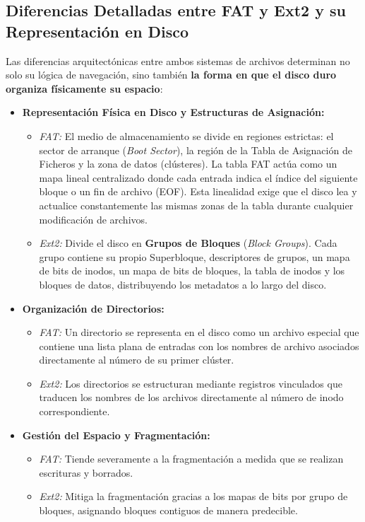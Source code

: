 \documentclass[12pt,a4paper]{article}
\begin{document}
	\subsection{Diferencias Detalladas entre FAT y Ext2 y su Representación en Disco}
	Las diferencias arquitectónicas entre ambos sistemas de archivos determinan no solo su lógica de navegación, sino también \textbf{la forma en que el disco duro organiza físicamente su espacio}:
	\begin{itemize}
		\item \textbf{Representación Física en Disco y Estructuras de Asignación:} 
		\begin{itemize}
			\item \textit{FAT:} El medio de almacenamiento se divide en regiones estrictas: el sector de arranque (\textit{Boot Sector}), la región de la Tabla de Asignación de Ficheros y la zona de datos (clústeres). La tabla FAT actúa como un mapa lineal centralizado donde cada entrada indica el índice del siguiente bloque o un fin de archivo (EOF). Esta linealidad exige que el disco lea y actualice constantemente las mismas zonas de la tabla durante cualquier modificación de archivos.
			\item \textit{Ext2:} Divide el disco en \textbf{Grupos de Bloques} (\textit{Block Groups}). Cada grupo contiene su propio Superbloque, descriptores de grupos, un mapa de bits de inodos, un mapa de bits de bloques, la tabla de inodos y los bloques de datos, distribuyendo los metadatos a lo largo del disco.
		\end{itemize}
		\item \textbf{Organización de Directorios:}
		\begin{itemize}
			\item \textit{FAT:} Un directorio se representa en el disco como un archivo especial que contiene una lista plana de entradas con los nombres de archivo asociados directamente al número de su primer clúster.
			\item \textit{Ext2:} Los directorios se estructuran mediante registros vinculados que traducen los nombres de los archivos directamente al número de inodo correspondiente.
		\end{itemize}
		\item \textbf{Gestión del Espacio y Fragmentación:} 
		\begin{itemize}
			\item \textit{FAT:} Tiende severamente a la fragmentación a medida que se realizan escrituras y borrados.
			\item \textit{Ext2:} Mitiga la fragmentación gracias a los mapas de bits por grupo de bloques, asignando bloques contiguos de manera predecible.
		\end{itemize}
	\end{itemize}
	
\end{document}
